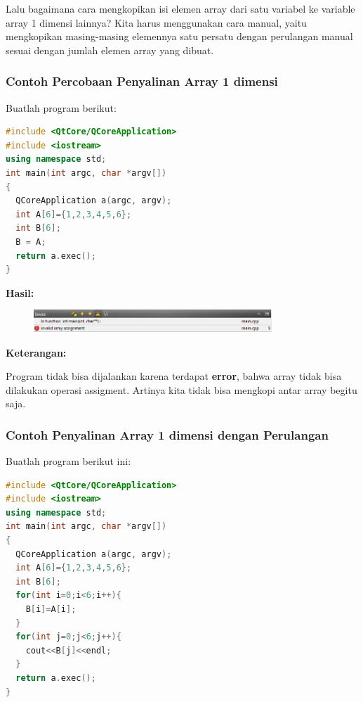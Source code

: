 Lalu bagaimana cara mengkopikan isi elemen array dari satu variabel ke
variable array 1 dimensi lainnya? Kita harus menggunakan cara manual,
yaitu mengkopikan masing-masing elemennya satu persatu dengan perulangan
manual sesuai dengan jumlah elemen array yang dibuat.

\subsubsection*{Contoh  Percobaan Penyalinan Array 1 dimensi}

Buatlah program berikut:

\begin{lstlisting}[language=c++, caption=Percobaan Penyalinan Array 1 dimensi, label=contoh3-8]
#include <QtCore/QCoreApplication>
#include <iostream>
using namespace std;
int main(int argc, char *argv[])
{
  QCoreApplication a(argc, argv);
  int A[6]={1,2,3,4,5,6};
  int B[6];
  B = A;
  return a.exec();
}
\end{lstlisting}

\textbf{Hasil:}

\begin{figure}[htbp]
\centering
\includegraphics[width=0.8\textwidth]{../manuscript/images/capture3-8.PNG}

\end{figure}

\textbf{Keterangan:}

Program tidak bisa dijalankan karena terdapat \textbf{error}, bahwa
array tidak bisa dilakukan operasi assigment. Artinya kita tidak bisa
mengkopi antar array begitu saja.

\subsubsection*{Contoh  Penyalinan Array 1 dimensi dengan Perulangan}

Buatlah program berikut ini:

\begin{lstlisting}[language=c++, caption=Penyalinan Array 1 dimensi dengan Perulangan, label=contoh3-8]
#include <QtCore/QCoreApplication>
#include <iostream>
using namespace std;
int main(int argc, char *argv[])
{
  QCoreApplication a(argc, argv);
  int A[6]={1,2,3,4,5,6};
  int B[6];
  for(int i=0;i<6;i++){
    B[i]=A[i];
  }
  for(int j=0;j<6;j++){
    cout<<B[j]<<endl;
  }
  return a.exec();
}
\end{lstlisting}

